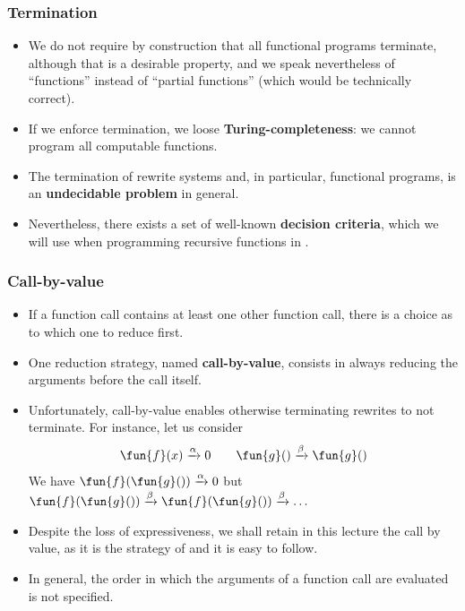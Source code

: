 \documentclass[compress,dvips,xcolor={dvipsnames},t]{beamer}
\begin{document}
\begin{frame}
  \frametitle{Termination}

  \begin{itemize}

    \item We do not require by construction that all functional
      programs terminate, although that is a desirable property, and
      we speak nevertheless of ``functions'' instead of ``partial
      functions'' (which would be technically correct).

    \item If we enforce termination, we loose
      \textbf{Turing\hyp{}completeness}: we cannot program all
      computable functions.

    \item The termination of rewrite systems and, in particular,
      functional programs, is an \textbf{undecidable problem} in
      general.

    \item Nevertheless, there exists a set of well\hyp{}known
      \textbf{decision criteria}, which we will use when programming
      recursive functions in \OCaml.

  \end{itemize}

\end{frame}

\begin{frame}
  \frametitle{Call-by-value}

  \begin{itemize}

    \item If a function call contains at least one other function
      call, there is a choice as to which one to reduce first.

    \item One reduction strategy, named \textbf{call-by-value},
      consists in always reducing the arguments before the call
      itself.

    \item Unfortunately, call-by-value enables otherwise terminating
      rewrites to not terminate. For instance, let us consider
      \begin{equation*}
        \fun{f}(x) \xrightarrow{\alpha} 0\qquad
        \fun{g}() \xrightarrow{\beta} \fun{g}()
      \end{equation*}
      We have \(\fun{f}(\fun{g}()) \xrightarrow{\alpha} 0\)
      but \(\fun{f}(\fun{g}()) \xrightarrow{\beta}
      \fun{f}(\fun{g}()) \xrightarrow{\beta} \dots\)

    \item Despite the loss of expressiveness, we shall retain in this
      lecture the call by value, as it is the strategy of \OCaml and
      it is easy to follow.

    \item In general, the order in which the arguments of a function
      call are evaluated is not specified.

  \end{itemize}

\end{frame}
\end{document}
